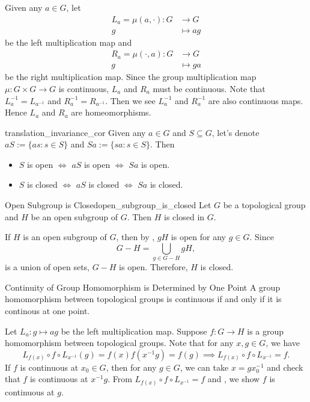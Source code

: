 \documentclass{report}
\begin{document}
\begin{prf}
	Given any $a\in G$, let
	\begin{align*}
		L_a=\mu(a,\cdot):G & \longrightarrow G \\
		g                  & \longmapsto ag
	\end{align*}
	be the left multiplication map and
	\begin{align*}
		R_a=\mu(\cdot,a):G & \longrightarrow G \\
		g                  & \longmapsto ga
	\end{align*}
	be the right multiplication map. Since the group multiplication map $\mu:G\times G\to G$ is continuous, $L_a$ and $R_a$ must be continuous. Note that $L_a^{-1}=L_{a^{-1}}$ and $R_a^{-1}=R_{a^{-1}}$. Then we see $L_a^{-1}$ and $R_a^{-1}$ are also continuous maps. Hence $L_a$ and $R_a$ are homeomorphisms.
\end{prf}


\begin{corollary}{}{translation_invariance_cor}
	Given any $a \in G$ and $S \subseteq G$, let's denote $a S:=\{a s: s \in S\}$ and $S a:=\{s a: s \in S\}$. Then
	\begin{itemize}
		\item $S$ is open $\iff$ $a S$ is open $\iff$ $S a$ is open.
		\item $S$ is closed $\iff$ $a S$ is closed $\iff$ $Sa$ is closed.
	\end{itemize}
\end{corollary}

\begin{proposition}{Open Subgroup is Closed}{open_subgroup_is_closed}
	Let $G$ be a topological group and $H$ be an open subgroup of $G$. Then $H$ is closed in $G$.
\end{proposition}
\begin{prf}
	If $H$ is an open subgroup of $G$, then	by , $gH$ is open for any $g\in G$. 
	Since
	\[
	G-H=\bigcup_{g\in G-H} gH,
	\]
	is a union of open sets, $G-H$ is open. Therefore, $H$ is closed.
\end{prf}

\begin{proposition}{Continuity of Group Homomorphism is Determined by One Point}{}
	A group homomorphism between topological groups is continuous if and only if it is continous at one point.
\end{proposition}
\begin{prf}
	Let $L_a: g\mapsto ag$ be the left multiplication map. Suppose $f:G\to H$ is a group homomorphism between topological groups. Note that for any $x,g\in G$, we have 
	\[
	 L_{f(x)}\circ f\circ L_{x^{-1}}(g)=f(x)f(x^{-1}g)=f(g)\implies L_{f(x)}\circ f\circ L_{x^{-1}}=f.
	\]
	If $f$ is continuous at $x_0 \in G$, then for any $g\in G$, we can take $x=gx_0^{-1}$ and check that $f$ is continuous at $x^{-1}g$. From $L_{f(x)}\circ f\circ L_{x^{-1}}=f$ and , we show $f$ is continuous at $g$. 
\end{prf}
\end{document}
